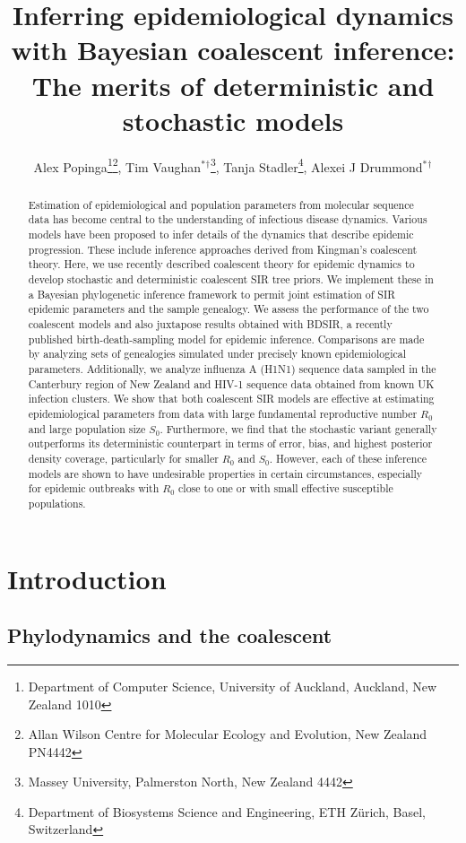 \documentclass[12pt,titlepage]{article}
\title{\Large{Inferring epidemiological dynamics with Bayesian coalescent inference:  The merits of deterministic and stochastic models}\\
\vspace{10mm}}
\author{Alex Popinga\thanks{Department of Computer Science, University of Auckland, Auckland, New Zealand 1010}\thanks{Allan Wilson Centre for Molecular Ecology and Evolution, New Zealand PN4442},  
Tim Vaughan$^{\ast}$$^{\dag}$\thanks{Massey University, Palmerston North, New Zealand 4442}, 
Tanja Stadler\thanks{Department of Biosystems Science and Engineering, ETH Z\"urich, Basel, Switzerland}, 
Alexei J Drummond$^{\ast}$$^{\dag}$}
\begin{document}
\maketitle



\begin{abstract}

Estimation of epidemiological and population parameters from molecular sequence data has become central to the understanding of infectious disease dynamics.  
Various models have been proposed to infer details of the dynamics that describe epidemic progression. 
These include inference approaches derived from Kingman's coalescent theory. 
Here, we use recently described coalescent theory for epidemic dynamics to develop stochastic and deterministic coalescent SIR tree priors. We implement these in a 
Bayesian phylogenetic inference framework to permit joint estimation of SIR epidemic parameters and the sample genealogy. 
We assess the performance of the two coalescent models and also juxtapose results obtained with BDSIR, a recently published birth-death-sampling model for epidemic inference.  
Comparisons are made by analyzing sets of genealogies
simulated under precisely known epidemiological parameters.  
Additionally, we analyze influenza A (H1N1) sequence data sampled in the Canterbury region of New Zealand and HIV-1 sequence data obtained from
known UK infection clusters. 
We show that both coalescent SIR models are effective at estimating epidemiological parameters from data with large fundamental reproductive number $R_0$ and large population size $S_0$. 
Furthermore, we find that the stochastic variant generally outperforms its deterministic counterpart in terms of error, bias, and highest posterior density coverage, particularly for smaller $R_0$ and $S_0$.  
However, each of these inference models are shown to have undesirable properties in certain circumstances, especially for epidemic outbreaks with $R_0$ close to one or with small effective susceptible populations.

\end{abstract}


\section{Introduction}

\subsection{Phylodynamics and the coalescent}
\end{document}
